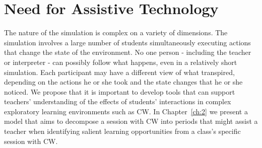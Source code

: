 \section{Need for Assistive Technology}\label{sec:need_for_assistive_tech}
The nature of the simulation is complex on a variety of dimensions. The simulation involves a large number of students simultaneously executing actions that change the state of the environment.  No one person - including the teacher or interpreter - can possibly follow what happens, even in a relatively short simulation. Each participant may have a different view of what transpired, depending on the actions he or she took and the state changes that he or she noticed. We propose that it is important to develop tools that can support teachers' understanding of the effects of students' interactions in complex exploratory learning environments such as CW. In Chapter~\ref{ch:2} we present a model that aims to decompose a session with CW into periods that might assist a teacher when identifying salient learning opportunities from a class's specific session with CW.
